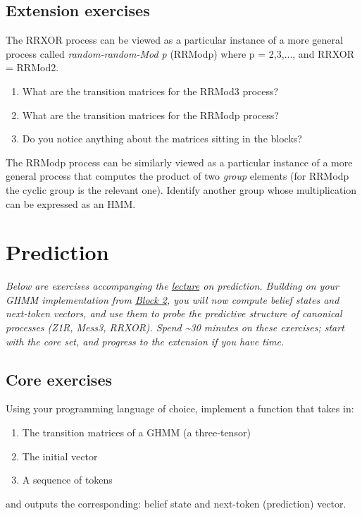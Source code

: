\documentclass[11pt]{article}
\begin{document}
\subsection{Extension exercises}\label{sec:hmm-ext}

\begin{exercise}
\label{ex:hmm-ext-1}
The RRXOR process can be viewed as a particular instance of a more general process called \emph{random-random-Mod p} (RRModp) where p = 2,3,..., and RRXOR = RRMod2.

\begin{enumerate}
\item
  What are the transition matrices for the RRMod3 process?
\item
  What are the transition matrices for the RRModp process?
\item
  Do you notice anything about the matrices sitting in the blocks?
\end{enumerate}
\end{exercise}

\begin{exercise}
\label{ex:hmm-ext-2}
The RRModp process can be similarly viewed as a particular instance of a more general process that computes the product of two \emph{group} elements (for RRModp the cyclic group is the relevant one). Identify another group whose multiplication can be expressed as an HMM.
\end{exercise}


\section{Prediction}\label{prediction}
\emph{Below are exercises accompanying the \href{https://drive.google.com/file/d/1IPz8Pq939VbjmVqYcYDybdJ02yvdgMGS/view?usp=sharing}{lecture} on prediction. Building on your GHMM implementation from \hyperref[hidden-markov-models]{Block 2}, you will now compute belief states and next-token vectors, and use them to probe the predictive structure of canonical processes (Z1R, Mess3, RRXOR). Spend \textasciitilde30 minutes on these exercises; start with the core set, and progress to the extension if you have time.}

\subsection{Core exercises}\label{sec:pred-core}

\begin{exercise}
\label{ex:pred-core-1}
Using your programming language of choice, implement a function that takes in:

\begin{enumerate}
\item
  The transition matrices of a GHMM (a three-tensor)
\item
  The initial vector
\item
  A sequence of tokens
\end{enumerate}

and outputs the corresponding: belief state and next-token (prediction) vector.
\end{exercise}
\end{document}
